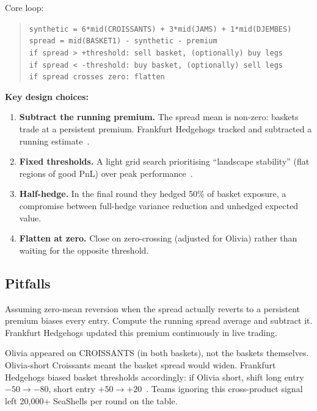 Core loop:

\begin{quote}
\texttt{synthetic = 6*mid(CROISSANTS) + 3*mid(JAMS) + 1*mid(DJEMBES)}\\
\texttt{spread = mid(BASKET1) - synthetic - premium}\\
\texttt{if spread > +threshold: sell basket, (optionally) buy legs}\\
\texttt{if spread < -threshold: buy basket, (optionally) sell legs}\\
\texttt{if spread crosses zero: flatten}
\end{quote}

\noindent
\textbf{Key design choices:}
\begin{enumerate}
  \item \textbf{Subtract the running premium.}  The spread mean is
  non-zero: baskets trade at a persistent premium.  Frankfurt
  Hedgehogs tracked and subtracted a running
  estimate~\citep{frankfurthedgehogs2025}.
  \item \textbf{Fixed thresholds.}  A light grid search prioritising
  ``landscape stability'' (flat regions of good PnL) over peak
  performance~\citep{frankfurthedgehogs2025}.
  \item \textbf{Half-hedge.}  In the final round they hedged 50\% of
  basket exposure, a compromise between full-hedge variance
  reduction and unhedged expected value.
  \item \textbf{Flatten at zero.}  Close on zero-crossing (adjusted
  for Olivia) rather than waiting for the opposite threshold.
\end{enumerate}

\subsection{Pitfalls}

\begin{pitfallbox}
Assuming zero-mean reversion when the spread actually reverts to a
persistent premium biases every entry.  Compute the running spread
average and subtract it.  Frankfurt Hedgehogs updated this premium
continuously in live trading.
\end{pitfallbox}

\begin{pitfallbox}
Olivia appeared on CROISSANTS (in both baskets), not the baskets
themselves.  Olivia-short Croissants meant the basket spread would
widen.  Frankfurt Hedgehogs biased basket thresholds accordingly: if
Olivia short, shift long entry $-50 \to -80$, short entry $+50 \to
+20$~\citep{frankfurthedgehogs2025}.  Teams ignoring this
cross-product signal left 20{,}000+ SeaShells per round on the table.
\end{pitfallbox}

